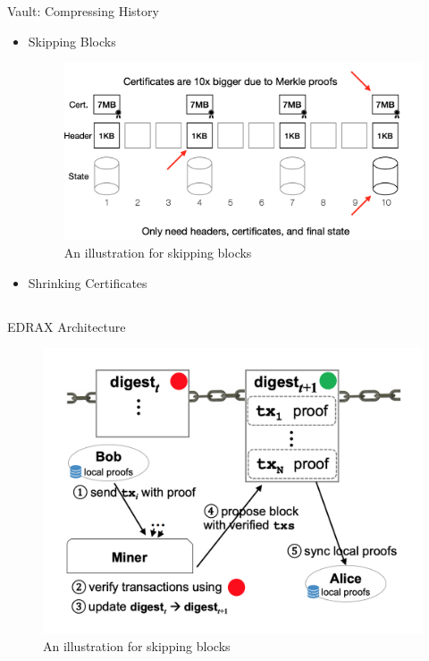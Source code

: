 \documentclass[biblatex,aspectratio=169,11pt]{mybeamer}
\begin{document}
\begin{frame}{Vault: Compressing History}
  \begin{itemize}
    \item Skipping Blocks
    \begin{figure}
      \includegraphics[width=0.5\linewidth]{figs/skip-block.png}
      \caption{An illustration for skipping blocks}
    \end{figure}
    \item Shrinking Certificates
  \end{itemize}
\end{frame}

\subsection{}

\begin{frame}{EDRAX Architecture}
  \begin{figure}
    \includegraphics[width=0.6\linewidth]{figs/Edrax-arch.png}
    \caption{An illustration for skipping blocks}
  \end{figure}
\end{frame}
\end{document}
